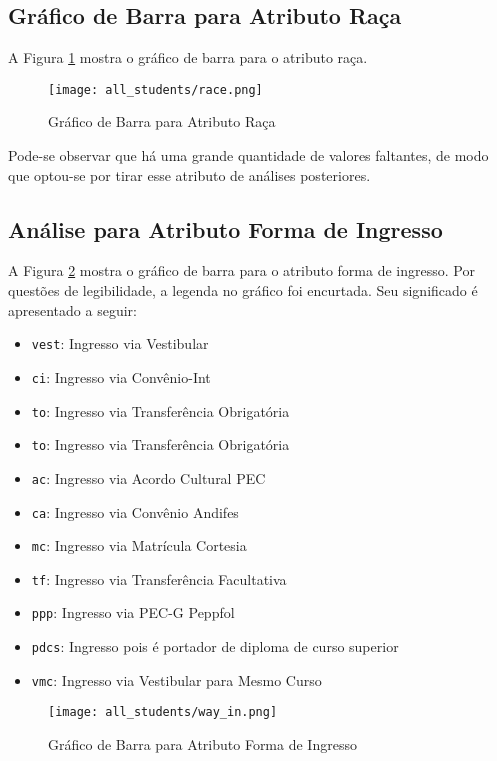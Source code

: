 \subsection{Gráfico de Barra para Atributo Raça}
A Figura \ref{atr_race} mostra o gráfico de barra para o atributo raça. 
\begin{figure}[!ht]
    \caption{Gráfico de Barra para Atributo Raça}
    \centering
    \texttt{[image: all\_students/race.png]}
    \label{atr_race}
\end{figure}
Pode-se observar que há uma grande quantidade de valores faltantes, de modo que
optou-se por tirar esse atributo de análises posteriores. 

\subsection{Análise para Atributo Forma de Ingresso}
A Figura \ref{atr_way_in} mostra o gráfico de barra para o atributo forma de ingresso. 
Por questões de legibilidade, a legenda no gráfico foi encurtada. Seu significado é
apresentado a seguir: 
\begin{itemize}
    \item \texttt{vest}: Ingresso via Vestibular
    \item \texttt{ci}: Ingresso via Convênio-Int
    \item \texttt{to}: Ingresso via Transferência Obrigatória
    \item \texttt{to}: Ingresso via Transferência Obrigatória
    \item \texttt{ac}: Ingresso via Acordo Cultural PEC
    \item \texttt{ca}: Ingresso via Convênio Andifes
    \item \texttt{mc}: Ingresso via Matrícula Cortesia
    \item \texttt{tf}: Ingresso via Transferência Facultativa
    \item \texttt{ppp}: Ingresso via PEC-G Peppfol
    \item \texttt{pdcs}: Ingresso pois é portador de diploma de curso superior
    \item \texttt{vmc}: Ingresso via Vestibular para Mesmo Curso
\end{itemize}

\begin{figure}[!ht]
    \caption{Gráfico de Barra para Atributo Forma de Ingresso}
    \centering
    \texttt{[image: all\_students/way\_in.png]}
    \label{atr_way_in}
\end{figure}

